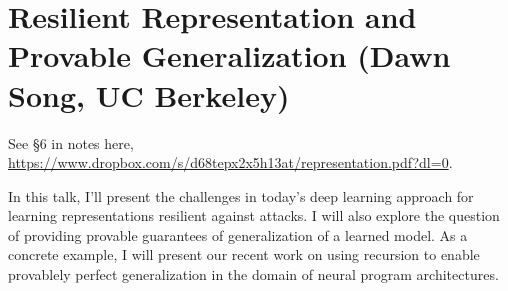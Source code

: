 \section{Resilient Representation and Provable Generalization (Dawn Song, UC Berkeley)}

See \S 6 in notes here, \url{https://www.dropbox.com/s/d68tepx2x5h13at/representation.pdf?dl=0}.

In this talk, I'll present the challenges in today's deep learning approach for learning representations resilient against attacks. I will also explore the question of providing provable guarantees of generalization of a learned model. As a concrete example, I will present our recent work on using recursion to enable provablely perfect generalization in the domain of neural program architectures. 

